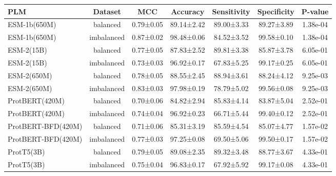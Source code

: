 \begin{tabular}{lcccccc}
\toprule
               PLM &    Dataset &       MCC &   Accuracy & Sensitivity & Specificity &  P-value \\
\midrule
      ESM-1b(650M) &   balanced & 0.79±0.05 & 89.14±2.42 &  89.00±3.33 &  89.27±3.89 & 1.38e-04 \\
      ESM-1b(650M) & imbalanced & 0.87±0.02 & 98.48±0.06 &  84.52±3.52 &  99.58±0.10 & 1.38e-04 \\
        ESM-2(15B) &   balanced & 0.77±0.05 & 87.83±2.52 &  89.81±3.38 &  85.87±3.78 & 6.05e-01 \\
        ESM-2(15B) & imbalanced & 0.73±0.03 & 96.92±0.17 &  67.83±5.25 &  99.17±0.25 & 6.05e-01 \\
       ESM-2(650M) &   balanced & 0.78±0.05 & 88.55±2.45 &  88.94±3.61 &  88.24±4.12 & 9.25e-03 \\
       ESM-2(650M) & imbalanced & 0.83±0.03 & 97.98±0.19 &  78.79±5.02 &  99.56±0.08 & 9.25e-03 \\
    ProtBERT(420M) &   balanced & 0.70±0.06 & 84.82±2.94 &  85.83±4.14 &  83.87±5.04 & 2.52e-01 \\
    ProtBERT(420M) & imbalanced & 0.74±0.04 & 96.92±0.23 &  66.71±5.44 &  99.40±0.12 & 2.52e-01 \\
ProtBERT-BFD(420M) &   balanced & 0.71±0.06 & 85.31±3.19 &  85.59±4.54 &  85.07±4.77 & 1.57e-02 \\
ProtBERT-BFD(420M) & imbalanced & 0.77±0.03 & 97.25±0.08 &  69.50±5.06 &  99.50±0.17 & 1.57e-02 \\
        ProtT5(3B) &   balanced & 0.79±0.05 & 89.08±2.35 &  89.32±3.48 &  88.77±3.67 & 4.33e-01 \\
        ProtT5(3B) & imbalanced & 0.75±0.04 & 96.83±0.17 &  67.92±5.92 &  99.17±0.08 & 4.33e-01 \\
\bottomrule
\end{tabular}
